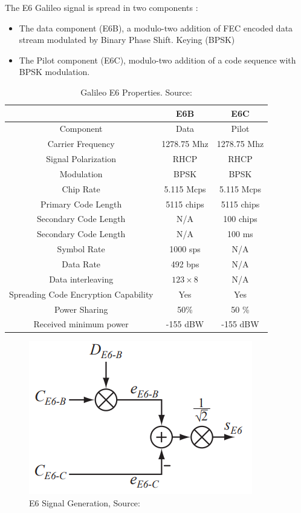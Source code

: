 The E6 Galileo signal is spread in two components \cite{e6breceiver}:
\begin{itemize}
    \item The data component (E6B), a modulo-two addition of FEC encoded data stream modulated by Binary Phase Shift. Keying (BPSK)
    \item The Pilot component (E6C), modulo-two addition of a code sequence with BPSK modulation.
\end{itemize}

\begin{table}[h!]
\centering
\begin{tabular}{| c | c | c |}
    \hline
    & E6B & E6C \\
    \hline
    Component & Data & Pilot \\
    \hline
    Carrier Frequency & 1278.75 Mhz & 1278.75 Mhz \\
    \hline
    Signal Polarization & RHCP & RHCP \\
    \hline
    Modulation & BPSK & BPSK \\
    \hline
    Chip Rate & 5.115 Mcps & 5.115 Mcps\\
    \hline
    Primary Code Length & 5115 chips & 5115 chips \\
    \hline
    Secondary Code Length & N/A & 100 chips \\
    \hline
    Secondary Code Length & N/A & 100 ms \\
    \hline
    Symbol Rate & 1000 sps & N/A \\
    \hline
    Data Rate & 492 bps & N/A\\
    \hline
    Data interleaving & $123 \times 8$ & N/A\\
    \hline
    Spreading Code Encryption Capability & Yes & Yes \\
    \hline
    Power Sharing & 50\% & 50 \% \\
    \hline
    Received minimum power & -155 dBW & -155 dBW \\
    \hline
\end{tabular}
\caption{Galileo E6 Properties. Source: \cite{e6breceiver}}
\label{table:2}
\end{table}

\begin{figure}[h]
\centering
\includegraphics[scale=0.7]{img/signal_generation.png}
\caption{E6 Signal Generation, Source:\cite{e6breceiver}}
\label{fig:signal_generation}
\end{figure}

